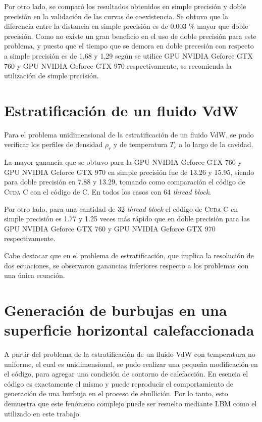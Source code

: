 Por otro lado, se comparó los resultados obtenidos en simple precisión y doble precisión en la validación de las curvas de coexistencia. Se obtuvo que la diferencia entre la distancia en simple precisión es de 0,003 \% mayor que doble precisión.  Como no existe un gran beneficio en el uso de doble precisión para este problema, y puesto que el tiempo que se demora en doble precesión con respecto a simple precisión es de 1,68 y 1,29 según se utilice GPU NVIDIA Geforce GTX 760 y GPU NVIDIA Geforce GTX 970 respectivamente, se recomienda la utilización de simple precisión.

\section{Estratificación de un fluido VdW}

Para el problema unidimensional de la estratificación de un fluido VdW, se pudo verificar los perfiles de densidad $\rho_r$ y de temperatura $T_r$ a lo largo de la cavidad. 

La mayor ganancia que se obtuvo para la GPU NVIDIA Geforce GTX 760 y GPU NVIDIA Geforce GTX 970 en simple precisión fue de 13.26 y 15.95, siendo para doble precisión en 7.88 y 13.29, tomando como comparación el código de \textsc{Cuda C} con el código de \textsc{C}. En todos los casos con 64 \textit{thread block}.

Por otro lado, para una cantidad de 32 \textit{thread block} el código de \textsc{Cuda C}  en simple precisión es 1.77 y 1.25 veces más rápido que en doble precisión para  las GPU NVIDIA Geforce GTX 760 y GPU NVIDIA Geforce GTX 970 respectivamente. 

Cabe destacar que en el problema de estratificación, que implica la resolución de dos ecuaciones, se observaron ganancias inferiores respecto a los problemas con una única ecuación.

\section{Generación de burbujas en una superficie horizontal calefaccionada}

A partir del problema de la estratificación de un fluido VdW con temperatura no uniforme, el cual es unidimensional, se pudo realizar una pequeña modificación en el código, para agregar una condición de contorno de calefacción. En esencia el código es exactamente el mismo y puede reproducir el comportamiento de generación de una burbuja en el proceso de ebullición. Por lo tanto, esto demuestra que este fenómeno complejo puede ser resuelto mediante LBM como el utilizado en este trabajo.

